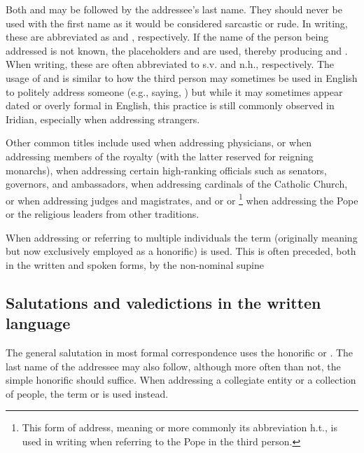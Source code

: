 Both  and  may be followed by the addressee's last name. They should never be used with
the first name as it would be considered sarcastic or rude. In writing, these are abbreviated as 
and , respectively. If the name of the person being addressed is not
known, the placeholders  and  are used, thereby producing 
and . When writing, these are often abbreviated to {\sc s.v.} and {\sc n.h.}, respectively.
The usage of  and  is similar to how the third person may sometimes be used
in English to politely address someone (e.g., saying, ) but while
it may sometimes appear dated or overly formal in English, this practice is still commonly observed
in Iridian, especially when addressing strangers.

Other common titles include  used when addressing physicians,  or 
when addressing members of the royalty (with the latter reserved for reigning monarchs),  when
addressing certain high-ranking officials such as senators, governors, and ambassadors,  when addressing
cardinals of the Catholic Church,  or  when addressing judges and magistrates, and
 or  or \footnote{This form of address, meaning
 or more commonly its abbreviation {\sc h.t.}, is used in writing when referring to the Pope in the
third person.} when addressing the Pope or the religious leaders from other traditions.

When addressing or referring to multiple individuals the term  (originally meaning 
but now exclusively employed as a honorific) is used. This is often preceded, both in the written and spoken forms,
by the non-nominal supine 

\subsection{Salutations and valedictions in the written language}

The general salutation in most formal correspondence uses the honorific  or .
The last name of the addressee may also follow, although more often than not, the simple honorific 
should suffice. When addressing a collegiate entity or a collection of people, the term  or
 is used instead.

